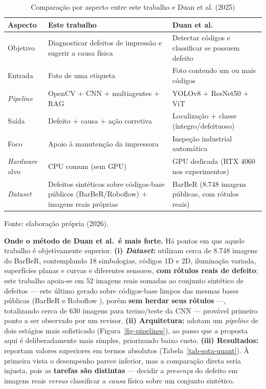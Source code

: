 \documentclass[
	article,			%
	11pt,				%
	oneside,			%
	a4paper,			%
	english,			%
	brazilian,			%
	sumario=tradicional
	]{abntex2}
\begin{document}
\begin{table}[htb]
\centering
\caption{Comparação por aspecto entre este trabalho e Duan et al. (2025)}
\label{tab-sota-qual}
\footnotesize
\begin{tabular}{@{}p{2.5cm}p{5.4cm}p{5.4cm}@{}}
\toprule
\textbf{Aspecto} & \textbf{Este trabalho} & \textbf{Duan et al. \cite{duan2025barcode}}\\
\midrule
Objetivo & Diagnosticar defeitos de impressão e sugerir a causa física &
Detectar códigos e classificar se possuem defeito\\
Entrada & Foto de uma etiqueta & Foto contendo um ou mais códigos\\
\textit{Pipeline} & OpenCV $+$ CNN $+$ multiagentes $+$ RAG &
YOLOv8 $+$ ResNet50 $+$ ViT\\
Saída & Defeito $+$ causa $+$ ação corretiva &
Localização $+$ classe (íntegro/defeituoso)\\
Foco & Apoio à manutenção da impressora & Inspeção industrial automática\\
\textit{Hardware} alvo & CPU comum (sem GPU) & GPU dedicada (RTX 4060 nos experimentos)\\
\textit{Dataset} & Defeitos sintéticos sobre códigos-base públicos (BarBeR/Roboflow) $+$ imagens reais próprias &
BarBeR (8.748 imagens públicas, com rótulos reais)\\
\bottomrule
\end{tabular}

\vspace{2pt}
{\footnotesize Fonte: elaboração própria (2026).}
\end{table}

\noindent\textbf{Onde o método de Duan et al.\ é mais forte.} Há pontos em que
aquele trabalho é objetivamente superior. \textbf{(i) \textit{Dataset}:}
utilizam cerca de 8.748 imagens do BarBeR, contemplando 18 simbologias, códigos
1D e 2D, iluminação variada, superfícies planas e curvas e diferentes sensores,
\textbf{com rótulos reais de defeito}; este trabalho apoia-se em 52 imagens reais
somadas ao conjunto sintético de defeitos --- este último gerado sobre
códigos-base limpos das mesmas bases públicas (BarBeR \cite{2024ICPR_barber} e
Roboflow \cite{roboflow_barcode}), porém \textbf{sem herdar seus rótulos} ---,
totalizando cerca de 630 imagens para treino/teste da CNN --- provável
primeiro ponto a ser observado por um revisor. \textbf{(ii) Arquitetura:} adotam
um \textit{pipeline} de dois estágios mais sofisticado
(Figura~\ref{fig-pipelines}), ao passo que a proposta aqui é deliberadamente mais
simples, priorizando baixo custo. \textbf{(iii) Resultados:} reportam valores
superiores em termos absolutos (Tabela~\ref{tab-sota-quant}). À primeira vista o
desempenho parece inferior, mas a comparação direta seria injusta, pois as
\textbf{tarefas são distintas} --- decidir a \emph{presença} do defeito em
imagens reais \textit{versus} classificar a \emph{causa} física sobre um conjunto
sintético.
\end{document}
